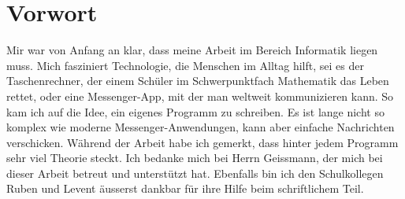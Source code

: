 \chapter{Vorwort}
\label{chap:Vorwort}

Mir war von Anfang an klar, dass meine Arbeit im Bereich Informatik liegen muss. Mich fasziniert Technologie, die Menschen im Alltag hilft, sei es der Taschenrechner, der einem Schüler im Schwerpunktfach Mathematik das Leben rettet, oder eine Messenger-App, mit der man weltweit kommunizieren kann. So kam ich auf die Idee, ein eigenes Programm zu schreiben. Es ist lange nicht so komplex wie moderne Messenger-Anwendungen, kann aber einfache Nachrichten verschicken. Während der Arbeit habe ich gemerkt, dass hinter jedem Programm sehr viel Theorie steckt. Ich bedanke mich bei Herrn Geissmann, der mich bei dieser Arbeit betreut und unterstützt hat. Ebenfalls bin ich den Schulkollegen Ruben und Levent äusserst dankbar für ihre Hilfe beim schriftlichem Teil.